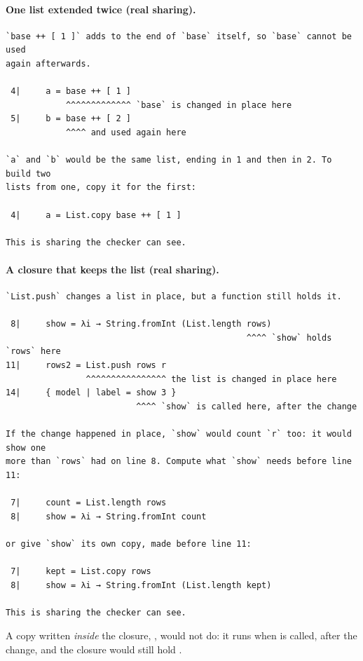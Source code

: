 \paragraph{One list extended twice (real sharing).}
\begin{Verbatim}
`base ++ [ 1 ]` adds to the end of `base` itself, so `base` cannot be used
again afterwards.

 4|     a = base ++ [ 1 ]
            ^^^^^^^^^^^^^ `base` is changed in place here
 5|     b = base ++ [ 2 ]
            ^^^^ and used again here

`a` and `b` would be the same list, ending in 1 and then in 2. To build two
lists from one, copy it for the first:

 4|     a = List.copy base ++ [ 1 ]

This is sharing the checker can see.
\end{Verbatim}

\paragraph{A closure that keeps the list (real sharing).}
\begin{Verbatim}
`List.push` changes a list in place, but a function still holds it.

 8|     show = λi → String.fromInt (List.length rows)
                                                ^^^^ `show` holds `rows` here
11|     rows2 = List.push rows r
                ^^^^^^^^^^^^^^^^ the list is changed in place here
14|     { model | label = show 3 }
                          ^^^^ `show` is called here, after the change

If the change happened in place, `show` would count `r` too: it would show one
more than `rows` had on line 8. Compute what `show` needs before line 11:

 7|     count = List.length rows
 8|     show = λi → String.fromInt count

or give `show` its own copy, made before line 11:

 7|     kept = List.copy rows
 8|     show = λi → String.fromInt (List.length kept)

This is sharing the checker can see.
\end{Verbatim}
A copy written \emph{inside} the closure, , would not do: it runs when
 is called, after the change, and the closure would still hold .

